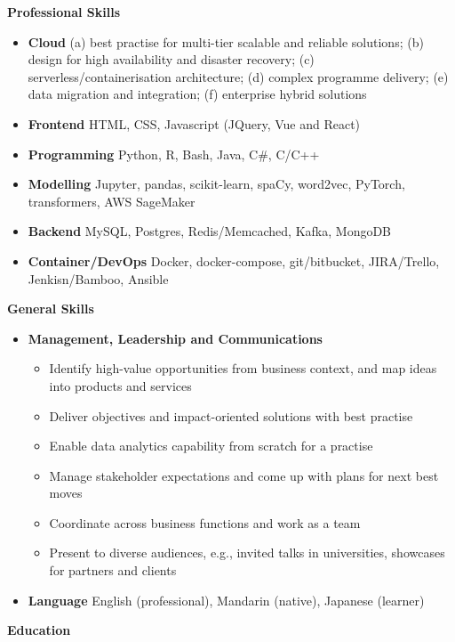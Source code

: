 \documentclass[letterpaper,12pt]{article}[leftmargin=*]
\def \entryspacing {-0pt}
\renewcommand{\section}[2]{\vspace{5pt}
  \colorbox{secondary}{\color{white}\raggedbottom\normalsize\textbf{{#1}{\hspace{7pt}#2}}}
}
\newcommand{\resumeEntryStart}{\begin{itemize}[leftmargin=2.5mm]}
\newcommand{\resumeEntryEnd}{\end{itemize}\vspace{\entryspacing}}
\newcommand{\resumeItemListStart}{\begin{itemize}[leftmargin=4.5mm]}
\newcommand{\resumeItemListEnd}{\end{itemize}}
\newcommand{\resumeItem}[1]{
  \item\small{
    {#1 \vspace{-2pt}}
  }
}
\newcommand{\resumeEntryS}[2]{
  \item[]\small{
    \textbf{\color{primary}#1 }{ #2 \vspace{-6pt}}
  }
}
\begin{document}
\section{\faGears}{Professional Skills}
 \resumeEntryStart
  \resumeEntryS{Cloud} {(a) best practise for multi-tier scalable and reliable solutions; (b) design for high availability and disaster recovery; (c) serverless/containerisation architecture; (d) complex programme delivery; (e) data migration and integration; (f) enterprise hybrid solutions}
  \resumeEntryS{Frontend} {HTML, CSS, Javascript (JQuery, Vue and React)}
  \resumeEntryS{Programming} {Python, R, Bash, Java, C\#, C/C++}
  \resumeEntryS{Modelling} {Jupyter, pandas, scikit-learn, spaCy, word2vec, PyTorch, transformers, AWS SageMaker}
  \resumeEntryS{Backend} {MySQL, Postgres, Redis/Memcached, Kafka, MongoDB}
  \resumeEntryS{Container/DevOps} {Docker, docker-compose, git/bitbucket, JIRA/Trello, Jenkisn/Bamboo, Ansible}
 \resumeEntryEnd

\section{\faGears}{General Skills}

 \resumeEntryStart
  \resumeEntryS{Management, Leadership and Communications}{
   \resumeItemListStart
      \resumeItem {Identify high-value opportunities from business context, and map ideas into products and services}
      \resumeItem {Deliver objectives and impact-oriented solutions with best practise}
      \resumeItem {Enable data analytics capability from scratch for a practise}
      \resumeItem {Manage stakeholder expectations and come up with plans for next best moves}
      \resumeItem {Coordinate across business functions and work as a team}
      \resumeItem {Present to diverse audiences, e.g., invited talks in universities, showcases for partners and clients}
    \resumeItemListEnd}
  \resumeEntryS{Language} {English (professional), Mandarin (native), Japanese (learner)}
 \resumeEntryEnd

\section{\faGraduationCap}{Education}
\end{document}
